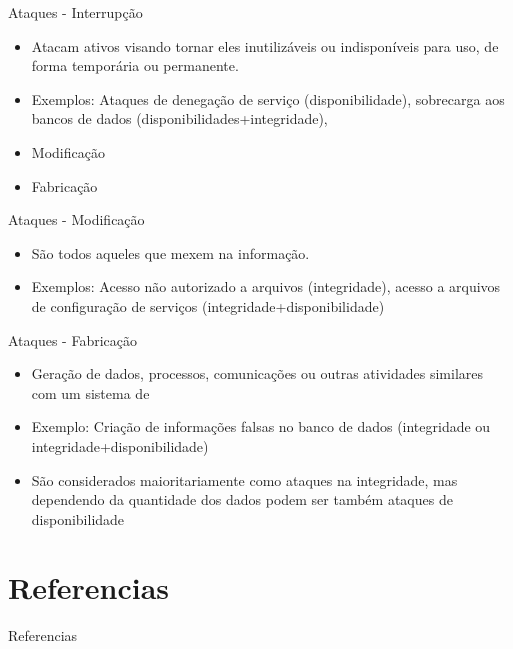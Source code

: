 \documentclass{beamer}
\begin{document}
\begin{frame}{Ataques - Interrupção}
\begin{itemize}
\item Atacam ativos visando tornar eles inutilizáveis ou indisponíveis para uso, de forma temporária ou permanente.
\item Exemplos: Ataques de denegação de serviço (disponibilidade), sobrecarga aos bancos de dados (disponibilidades+integridade), 
\item Modificação
\item Fabricação
\end{itemize}
\end{frame}

\begin{frame}{Ataques - Modificação}
\begin{itemize}
\item São todos aqueles que mexem na informação.
\item Exemplos: Acesso não autorizado a arquivos (integridade), acesso a arquivos de configuração de serviços (integridade+disponibilidade)
\end{itemize}
\end{frame}

\begin{frame}{Ataques - Fabricação}
\begin{itemize}
\item Geração de dados, processos, comunicações ou outras atividades similares com um sistema de
\item Exemplo: Criação de informações falsas no banco de dados (integridade ou integridade+disponibilidade)
\item São considerados maioritariamente como ataques na integridade, mas dependendo da quantidade dos dados podem ser também ataques de disponibilidade
\end{itemize}
\end{frame}

\section{Referencias}
\begin{frame}[allowframebreaks]{Referencias}
    
    
\end{frame}
\end{document}
